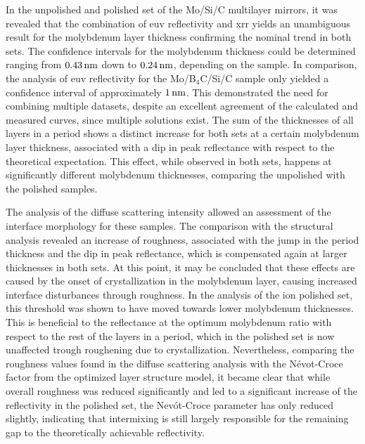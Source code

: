 In the unpolished and polished set of the Mo/Si/C multilayer mirrors, it was revealed that the combination of \gls{euv} reflectivity and \glsdesc{xrr} yields an unambiguous result for the molybdenum layer thickness confirming the nominal trend in both sets. The confidence intervals for the molybdenum thickness could be determined ranging from $\nm{0.43}$ down to $\nm{0.24}$, depending on the sample. In comparison, the analysis of \gls{euv} reflectivity for the Mo/B$_4$C/Si/C sample only yielded a confidence interval of approximately $\nm{1}$. This demonstrated the need for combining multiple datasets, despite an excellent agreement of the calculated and measured curves, since multiple solutions exist.
The sum of the thicknesses of all layers in a period shows a distinct increase for both sets at a certain molybdenum layer thickness, associated with a dip in peak reflectance with respect to the theoretical expectation. This effect, while observed in both sets, happens at significantly different molybdenum thicknesses, comparing the unpolished with the polished samples.

The analysis of the diffuse scattering intensity allowed an assessment of the interface morphology for these samples. The comparison with the structural analysis revealed an increase of roughness, associated with the jump in the period thickness and the dip in peak reflectance, which is compensated again at larger thicknesses in both sets. At this point, it may be concluded that these effects are caused by the onset of crystallization in the molybdenum layer, causing increased interface disturbances through roughness. In the analysis of the ion polished set, this threshold was shown to have moved towards lower molybdenum thicknesses. This is beneficial to the reflectance at the optimum molybdenum ratio with respect to the rest of the layers in a period, which in the polished set is now unaffected trough roughening due to crystallization. Nevertheless, comparing the roughness values found in the diffuse scattering analysis with the N{\'e}vot-Croce factor from the optimized layer structure model, it became clear that while overall roughness was reduced significantly and led to a significant increase of the reflectivity in the polished set, the Nev{\'o}t-Croce parameter has only reduced slightly, indicating that intermixing is still largely responsible for the remaining gap to the theoretically achievable reflectivity.

